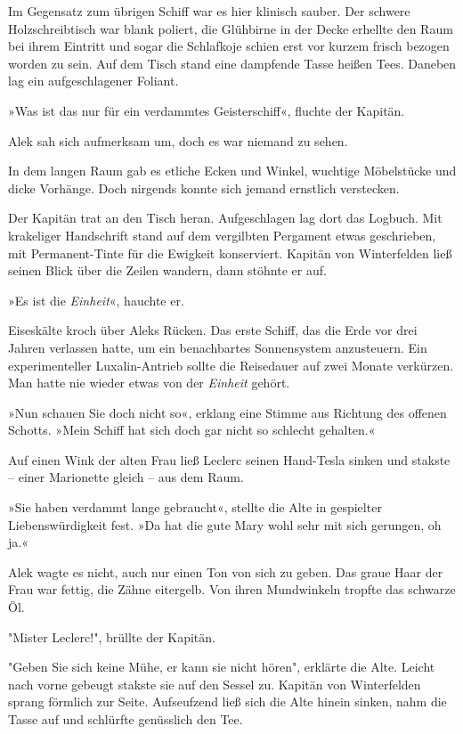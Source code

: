 Im Gegensatz zum übrigen Schiff war es hier klinisch sauber. Der
schwere Holzschreibtisch war blank poliert, die Glühbirne in der
Decke erhellte den Raum bei ihrem Eintritt und sogar die Schlafkoje
schien erst vor kurzem frisch bezogen worden zu sein. Auf dem Tisch
stand eine dampfende Tasse heißen Tees. Daneben lag ein
aufgeschlagener Foliant.

»Was ist das nur für ein verdammtes Geisterschiff«, fluchte der
Kapitän.

Alek sah sich aufmerksam um, doch es war niemand zu sehen.

In dem langen Raum gab es etliche Ecken und Winkel, wuchtige
Möbelstücke und dicke Vorhänge. Doch nirgends konnte sich jemand
ernstlich verstecken.

Der Kapitän trat an den Tisch heran. Aufgeschlagen lag dort das
Logbuch. Mit krakeliger Handschrift stand auf dem vergilbten
Pergament etwas geschrieben, mit Permanent-Tinte für die Ewigkeit
konserviert. Kapitän von Winterfelden ließ seinen Blick über die
Zeilen wandern, dann stöhnte er auf.

»Es ist die \textit{Einheit}«, hauchte er.

\bigpar

Eiseskälte kroch über Aleks Rücken. Das erste Schiff, das die Erde
vor drei Jahren verlassen hatte, um ein benachbartes Sonnensystem
anzusteuern. Ein experimenteller Luxalin-Antrieb sollte die
Reisedauer auf zwei Monate verkürzen. Man hatte nie wieder etwas
von der \textit{Einheit} gehört.

»Nun schauen Sie doch nicht so«, erklang eine Stimme aus Richtung
des offenen Schotts. »Mein Schiff hat sich doch gar nicht so
schlecht gehalten.«

\tb

Auf einen Wink der alten Frau ließ Leclerc seinen Hand-Tesla sinken
und stakste – einer Marionette gleich – aus dem Raum.

»Sie haben verdammt lange gebraucht«, stellte die Alte in
gespielter Liebenswürdigkeit fest. »Da hat die gute Mary wohl sehr
mit sich gerungen, oh ja.«

Alek wagte es nicht, auch nur einen Ton von sich zu geben. Das
graue Haar der Frau war fettig, die Zähne eitergelb. Von ihren
Mundwinkeln tropfte das schwarze Öl.

"Mister Leclerc!", brüllte der Kapitän.

"Geben Sie sich keine Mühe, er kann sie nicht hören", erklärte die
Alte. Leicht nach vorne gebeugt stakste sie auf den Sessel zu.
Kapitän von Winterfelden sprang förmlich zur Seite. Aufseufzend
ließ sich die Alte hinein sinken, nahm die Tasse auf und schlürfte
genüsslich den Tee.

